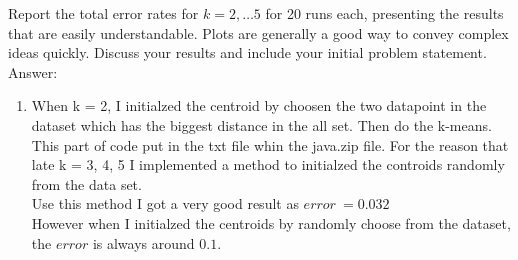 \documentclass{article}
\begin{document}
\begin{enumerate}
Report the total error rates for $k = 2,\ldots 5$ for 20 runs each, presenting the results that are easily understandable.  Plots are generally a good way to convey complex ideas quickly.  Discuss your results and include your initial problem statement. \\
Answer:\\
\begin{enumerate}
	\item When k = 2, I initialzed the centroid by choosen the two datapoint in the dataset which has the biggest distance in the all set. Then do the k-means. This part of code put in the txt file whin the java.zip file. For the reason that late k = 3, 4, 5 I implemented a method to initialzed the controids randomly from the data set.\\
	Use this method I got a very good result as $error\ = 0.032$\\
	However when I initialzed the centroids by randomly choose from the dataset, the $error$ is always around $0.1$.
	

\end{enumerate}
\end{enumerate}
\end{document}
